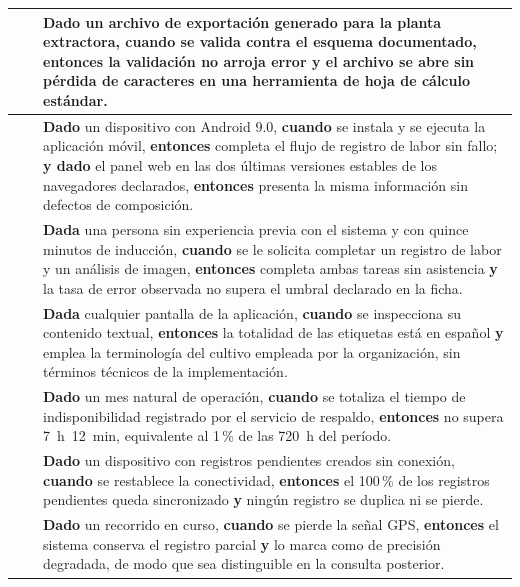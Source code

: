 \begin{longtable}{|C{1.5cm}|C{1.5cm}|L{12.4cm}|}
 &  & \textbf{Dado} un archivo de exportación generado para la planta extractora, \textbf{cuando} se valida contra el esquema documentado, \textbf{entonces} la validación no arroja error \textbf{y} el archivo se abre sin pérdida de caracteres en una herramienta de hoja de cálculo estándar. \\ \hline

 &  & \textbf{Dado} un dispositivo con Android 9.0, \textbf{cuando} se instala y se ejecuta la aplicación móvil, \textbf{entonces} completa el flujo de registro de labor sin fallo; \textbf{y dado} el panel web en las dos últimas versiones estables de los navegadores declarados, \textbf{entonces} presenta la misma información sin defectos de composición. \\ \hline

 &  & \textbf{Dada} una persona sin experiencia previa con el sistema y con quince minutos de inducción, \textbf{cuando} se le solicita completar un registro de labor y un análisis de imagen, \textbf{entonces} completa ambas tareas sin asistencia \textbf{y} la tasa de error observada no supera el umbral declarado en la ficha. \\ \hline

 &  & \textbf{Dada} cualquier pantalla de la aplicación, \textbf{cuando} se inspecciona su contenido textual, \textbf{entonces} la totalidad de las etiquetas está en español \textbf{y} emplea la terminología del cultivo empleada por la organización, sin términos técnicos de la implementación. \\ \hline

 &  & \textbf{Dado} un mes natural de operación, \textbf{cuando} se totaliza el tiempo de indisponibilidad registrado por el servicio de respaldo, \textbf{entonces} no supera 7~h~12~min, equivalente al 1\,\% de las 720~h del período. \\ \hline

 &  & \textbf{Dado} un dispositivo con registros pendientes creados sin conexión, \textbf{cuando} se restablece la conectividad, \textbf{entonces} el 100\,\% de los registros pendientes queda sincronizado \textbf{y} ningún registro se duplica ni se pierde. \\ \hline

 &  & \textbf{Dado} un recorrido en curso, \textbf{cuando} se pierde la señal GPS, \textbf{entonces} el sistema conserva el registro parcial \textbf{y} lo marca como de precisión degradada, de modo que sea distinguible en la consulta posterior. \\ \hline


\end{longtable}
